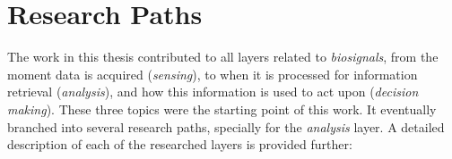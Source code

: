 
\section{Research Paths}

The work in this thesis contributed to all layers related to \textit{biosignals}, from the moment data is acquired (\textit{sensing}), to when it is processed for information retrieval (\textit{analysis}), and how this information is used to act upon (\textit{decision making}). These three topics were the starting point of this work. It eventually branched into several research paths, specially for the \textit{analysis} layer.
A detailed description of each of the researched layers is provided further:

